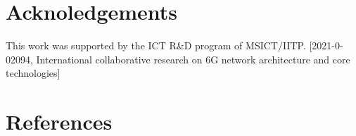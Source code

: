 \documentclass[a4paper]{article}
\begin{document}
\section{Acknoledgements}
This work was supported by the ICT R\&D program of MSICT/IITP. [2021-0-02094, International collaborative research on 6G network architecture and core technologies]

\section{References}

\begin{comment}
\begin{tikzpicture}[bound/.style={draw=black,rectangle, minimum width=2.3cm, minimum height=3cm,fill=blue!10},
log/.style={rectangle,draw=black, minimum width=2.1cm, minimum height=0.7cm, inner sep=2pt, align=center,font=\footnotesize}]
	\node[bound,fill=blue!30] at (0,0) (b1) {};
	\node[bound,right] at ([xshift=5pt]b1.east) (b2) {};
	\node[bound,right] at ([xshift=50pt]b2.east) (b3) {};
	\node[bound,fill=blue!30,right] at ([xshift=5pt]b3.east) (b4) {};
	
	\node[log,below] at ([yshift=-5pt]b1.north) (m1) {service logic};
	\node[log,below] at ([yshift=-5pt]b2.north) (m2) {proxy logic};
	\node[log,below] at ([yshift=-5pt]b3.north) (m3) {proxy logic};
	\node[log,below] at ([yshift=-5pt]b4.north) (m4) {service logic};
	\node[below] at ([yshift=-10pt]m1.south) {\footnotesize http};
	\node[below] at ([yshift=-30pt]m1.south) {\footnotesize L1 - L4};
	\node[below] at ([yshift=-10pt]m2.south) {\footnotesize http};
	\node[below] at ([yshift=-30pt]m2.south) {\footnotesize L1 - L4};
	\node[below] at ([yshift=-10pt]m3.south) {\footnotesize http};
	\node[below] at ([yshift=-30pt]m3.south) {\footnotesize L1 - L4};
	\node[below] at ([yshift=-10pt]m4.south) {\footnotesize http};
	\node[below] at ([yshift=-30pt]m4.south) {\footnotesize L1 - L4};
	\coordinate (p1) at ([xshift=10pt]b2.south west);
	\coordinate (p2) at ([xshift=-10pt]b2.south east);
	\coordinate (p3) at ([xshift=10pt]b3.south west);
	\coordinate (p4) at ([xshift=-10pt]b3.south east);
	
	\draw[<->,thick,purple] (m1) -- (b1.south) to[out=-90,in=-90] (p1) -- (p1 |-m2.south) to[out=90,in=90] (p2 |- m2.south) -- (p2) to[out=-90,in=-90] (p3) -- (p3 |- m3.south) to[out=90,in=90] (p4|-m3.south) -- (p4) to[out=-90,in=-90] (b4.south) -- (m4);
\end{tikzpicture}
\end{comment}
\end{document}
